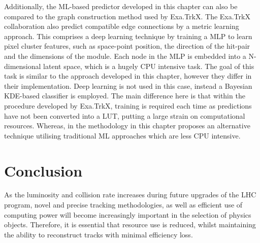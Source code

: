 Additionally, the ML-based predictor developed in this chapter can also be compared to the graph construction method used by Exa.TrkX. The Exa.TrkX collaboration also predict compatible edge connections by a metric learning approach. This comprises a deep learning technique by training a MLP to learn pixel cluster features, such as space-point position, the direction of the hit-pair and the dimensions of the module. Each node in the MLP is embedded into a N-dimensional latent space, which is a hugely CPU intensive task. The goal of this task is similar to the approach developed in this chapter, however they differ in their implementation. Deep learning is not used in this case, instead a Bayesian KDE-based classifier is employed. The main difference here is that within the procedure developed by Exa.TrkX, training is required each time as predictions have not been converted into a LUT, putting a large strain on computational resources. Whereas, in the methodology in this chapter proposes an alternative technique utilising traditional ML approaches which are less CPU intensive.


\section{Conclusion}

As the luminosity and collision rate increases during future upgrades of the LHC program, novel and precise tracking methodologies, as well as efficient use of computing power will become increasingly important in the selection of physics objects. Therefore, it is essential that resource use is reduced, whilst maintaining the ability to reconstruct tracks with minimal efficiency loss. 

